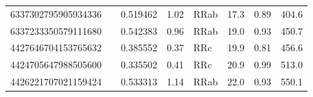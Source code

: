\documentclass[twocolumn]{aastex63}
\begin{document}
\begin{table}[t]
\begin{footnotesize}
\begin{tabular}{llllllll}
6337302795905934336 &    & 0.519462 & 1.02 & RRab & 17.3 & 0.89 & 404.6 \\
6337233350579111680 &    & 0.542383 & 0.96 & RRab & 19.0 & 0.93 & 450.7 \\
4427646704153765632 &    & 0.385552 & 0.37 & RRc & 19.9 & 0.81 & 456.6 \\
4424705647988505600 &    & 0.335502 & 0.41 & RRc & 20.9 & 0.99 & 513.0 \\
4426221707021159424 &    & 0.533313 & 1.14 & RRab & 22.0 & 0.93 & 550.1 \\
\bottomrule
\end{tabular}
\end{footnotesize}
\end{table}



\end{document}
